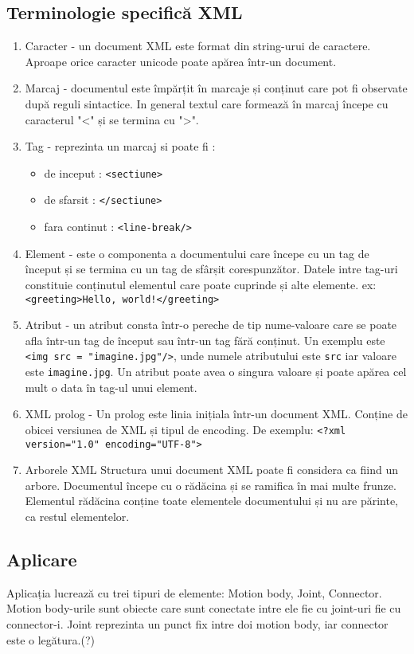 \subsection{Terminologie specifică XML}

\begin{enumerate}[wide=0pt, listparindent=1.25em, parsep=0pt]
    \item Caracter - un document XML este format din string-urui de caractere. Aproape orice caracter unicode poate apărea într-un document.
    \item Marcaj - documentul este împărțit în marcaje și conținut care pot fi observate după reguli sintactice. In general textul care formează în marcaj începe cu caracterul "<" și se termina cu ">". 
    \item Tag - reprezinta un marcaj si poate fi :
    \begin{itemize}
        \item de inceput : \verb|<sectiune>|
        \item de sfarsit : \verb|</sectiune>|
        \item fara continut : \verb|<line-break/>|
    \end{itemize}
    \item Element - este o componenta a documentului care începe cu un tag de început și se termina cu un tag de 
    sfârșit corespunzător. Datele intre tag-uri constituie conținutul elementul care poate cuprinde și alte elemente.\newline 
    ex: \verb|<greeting>Hello, world!</greeting>|
    \item Atribut - un atribut consta într-o pereche de tip nume-valoare care se poate afla într-un tag de început sau 
    într-un tag fără conținut.\newline 
    Un exemplu este \verb|<img src = "imagine.jpg"/>|, unde numele atributului este \verb|src| iar valoare 
    este \verb|imagine.jpg|. Un atribut poate avea o singura valoare și poate apărea cel mult o data în tag-ul unui element. 
    \item XML prolog - Un prolog este linia inițiala într-un document XML. Conține de obicei versiunea de XML și tipul de encoding.\newline 
    De exemplu: \verb|<?xml version="1.0" encoding="UTF-8">|
    \item Arborele XML Structura unui document XML poate fi considera ca fiind un arbore. 
    Documentul începe cu o rădăcina și se ramifica în mai multe frunze. 
    Elementul rădăcina conține toate elementele documentului și nu are părinte, ca restul elementelor.
\end{enumerate} 

\subsection{Aplicare}
Aplicația lucrează cu trei tipuri de elemente: Motion body, Joint, Connector. 
Motion body-urile sunt obiecte care sunt conectate intre ele fie cu joint-uri fie cu connector-i. 
Joint reprezinta un punct fix intre doi motion body, iar connector este o legătura.(?)
